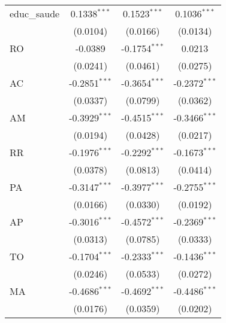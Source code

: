\begin{tabular}{lccc}
   educ\_saude                     & 0.1338$^{***}$          & 0.1523$^{***}$          & 0.1036$^{***}$\\   
                                   & (0.0104)                & (0.0166)                & (0.0134)\\   
   RO                              & -0.0389                 & -0.1754$^{***}$         & 0.0213\\   
                                   & (0.0241)                & (0.0461)                & (0.0275)\\   
   AC                              & -0.2851$^{***}$         & -0.3654$^{***}$         & -0.2372$^{***}$\\   
                                   & (0.0337)                & (0.0799)                & (0.0362)\\   
   AM                              & -0.3929$^{***}$         & -0.4515$^{***}$         & -0.3466$^{***}$\\   
                                   & (0.0194)                & (0.0428)                & (0.0217)\\   
   RR                              & -0.1976$^{***}$         & -0.2292$^{***}$         & -0.1673$^{***}$\\   
                                   & (0.0378)                & (0.0813)                & (0.0414)\\   
   PA                              & -0.3147$^{***}$         & -0.3977$^{***}$         & -0.2755$^{***}$\\   
                                   & (0.0166)                & (0.0330)                & (0.0192)\\   
   AP                              & -0.3016$^{***}$         & -0.4572$^{***}$         & -0.2369$^{***}$\\   
                                   & (0.0313)                & (0.0785)                & (0.0333)\\   
   TO                              & -0.1704$^{***}$         & -0.2333$^{***}$         & -0.1436$^{***}$\\   
                                   & (0.0246)                & (0.0533)                & (0.0272)\\   
   MA                              & -0.4686$^{***}$         & -0.4692$^{***}$         & -0.4486$^{***}$\\   
                                   & (0.0176)                & (0.0359)                & (0.0202)\\   

\end{tabular}
